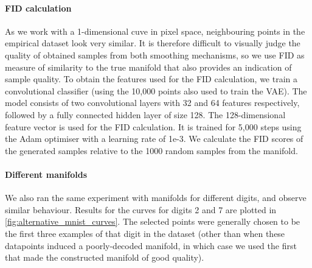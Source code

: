 \documentclass[10pt]{article}
\theoremstyle{plain}
\theoremstyle{definition}
\theoremstyle{remark}
\begin{document}
\paragraph{FID calculation}
As we work with a 1-dimensional cuve in pixel space, neighbouring points in the empirical dataset look very similar. It is therefore difficult to visually judge the quality of obtained samples from both smoothing mechanisms, so we use FID \citep{heusel17_FID} as measure of similarity to the true manifold that also provides an indication of sample quality.
To obtain the features used for the FID calculation, we train a convolutional classifier (using the 10,000 points also used to train the VAE).
The model consists of two convolutional layers with 32 and 64 features respectively, followed by a fully connected hidden layer of size 128. The 128-dimensional feature vector is used for the FID calculation. It is trained for 5,000 steps using the Adam optimiser with a learning rate of 1e-3. We calculate the FID scores of the generated samples relative to the 1000 random samples from the manifold.


\paragraph{Different manifolds}
We also ran the same experiment with manifolds for different digits, and observe similar behaviour.
Results for the curves for digits 2 and 7 are plotted in \cref{fig:alternative_mnist_curves}. The selected points were generally chosen to be the first three examples of that digit in the dataset (other than when these datapoints induced a poorly-decoded manifold, in which case we used the first that made the constructed manifold of good quality).
\end{document}
